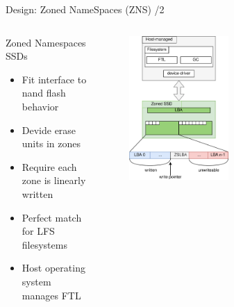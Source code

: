 \documentclass[aspectratio=169, notes]{beamer}
\begin{document}
\begin{frame}{Design: Zoned NameSpaces (ZNS) /2}
    \begin{columns}
        \begin{column}{0.45\textwidth}
            \footnotesize
            Zoned Namespaces SSDs
            \begin{itemize}
                \item Fit interface to nand flash behavior
                \item Devide erase units in zones
                \item Require each zone is linearly written
                \item Perfect match for LFS filesystems
                \item Host operating system manages FTL
            \end{itemize}
        \end{column}
        \begin{column}{0.55\textwidth}
            \begingroup
            \small
            \begin{figure}
                \centering
                \includegraphics[width=0.5\textwidth]{resources/images/zns-lfs2.png}
            \end{figure}
            \endgroup
        \end{column}
    \end{columns}
\end{frame}
\end{document}
